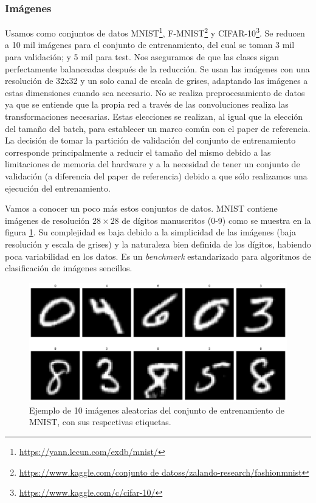 \subsubsection{Imágenes}

Usamos como conjuntos de datos MNIST\footnote{\url{https://yann.lecun.com/exdb/mnist/}}, F-MNIST\footnote{\url{https://www.kaggle.com/conjunto de datoss/zalando-research/fashionmnist}} y CIFAR-10\footnote{\url{https://www.kaggle.com/c/cifar-10/}}. Se reducen a 10 mil imágenes para el conjunto de entrenamiento, del cual se toman 3 mil para validación; y 5 mil para test. Nos aseguramos de que las clases sigan perfectamente balanceadas después de la reducción. Se usan las imágenes con una resolución de 32x32 y un solo canal de escala de grises, adaptando las imágenes a estas dimensiones cuando sea necesario. No se realiza preprocesamiento de datos ya que se entiende que la propia red a través de las convoluciones realiza las transformaciones necesarias. Estas elecciones se realizan, al igual que la elección del tamaño del batch, para establecer un marco común con el paper de referencia. La decisión de tomar la partición de validación del conjunto de entrenamiento corresponde principalmente a reducir el tamaño del mismo debido a las limitaciones de memoria del hardware y a la necesidad de tener un conjunto de validación (a diferencia del paper de referencia) debido a que sólo realizamos una ejecución del entrenamiento.

Vamos a conocer un poco más estos conjuntos de datos. MNIST contiene imágenes de resolución $28 \times 28$ de dígitos manuscritos (0-9) como se muestra en la figura \ref{fig:mnist}. Su complejidad es baja debido a la simplicidad de las imágenes (baja resolución y escala de grises) y la naturaleza bien definida de los dígitos, habiendo poca variabilidad en los datos. Es un \textit{benchmark} estandarizado para algoritmos de clasificación de imágenes sencillos.

\begin{figure}
    \centering
    \includegraphics[width=0.75\linewidth]{Plantilla_TFG_latex//imagenes//Inf//exp/mnist.png}
    \caption{Ejemplo de 10 imágenes aleatorias del conjunto de entrenamiento de MNIST, con sus respectivas etiquetas.}
    \label{fig:mnist}
\end{figure}

